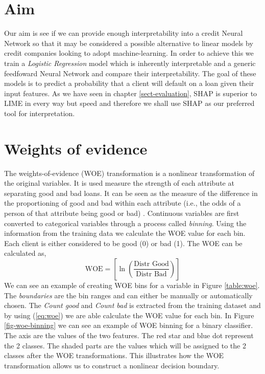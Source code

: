 \section{Aim}
 Our aim is see if we can provide enough interpretability into a credit Neural Network so that it may be considered a possible alternative to linear models by credit companies looking to adopt machine-learning. In order to achieve this we train a \emph{Logistic Regression} model which is inherently interpretable and a generic feedfoward Neural Network and compare their interpretability. The goal of these models is to predict a probability that a client will default on a loan given their input features. As we have seen in chapter \ref{sect-evaluation}, SHAP is superior to LIME in every way but speed and therefore we shall use SHAP as our preferred tool for interpretation.
 
\section{Weights of evidence}
 The weights-of-evidence (WOE) transformation \cite{Siddiqi2005CreditRS} is a nonlinear transformation of the original variables. It is used measure the strength of each attribute at separating good and bad loans. It can be seen as the measure of the difference in the proportioning of good and bad within each attribute (i.e., the odds of a person of that attribute being good or bad) \cite{Siddiqi2005CreditRS}.  Continuous variables are first converted to categorical variables through a process called \emph{binning}. Using the information from the training data we calculate the WOE value for each bin. Each client is either considered to be good (0) or bad (1).
 The WOE can be calculated as,
  \begin{equation}
     \mbox{WOE} = \left[ \ln{\left(\frac{\mbox{Distr Good}}{\mbox{Distr Bad}}\right)} \right] 
     \label{eq:woe}
 \end{equation}
We can see an example of creating WOE bins for a variable  in Figure \ref{table:woe}. The \emph{boundaries} are the bin ranges and can either be manually or automatically chosen. The \emph{Count good} and \emph{Count bad} is extracted from the training dataset and by using (\ref{eq:woe}) we are able calculate the WOE value for each bin. In Figure \ref{fig-woe-binning} we can see an example of WOE binning for a binary classifier. The axis are the values of the two features. The red star and blue dot represent the 2 classes. The shaded parts are the values which will be assigned to the 2 classes after the WOE transformations. This illustrates how the WOE transformation allows us to construct a nonlinear decision boundary.

